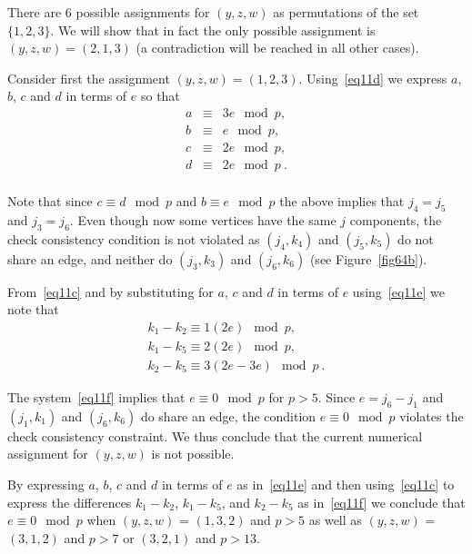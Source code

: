 There are 6 possible assignments for $(y,z,w)$ as permutations of
the set $\{1,2,3\}$. We will show that in fact the only possible
assignment is $(y,z,w)=(2,1,3)$ (a contradiction will be reached
in all other cases).

Consider first the assignment $(y,z,w)=(1,2,3)$.
Using~\eqref{eq11d} we express $a$, $b$, $c$ and $d$ in terms of
$e$ so that
\begin{equation}\label{eq11e}\begin{array}{cccc}
a &\equiv & 3e \mod p, \\
b &\equiv & e \mod p, \\
c &\equiv & 2e \mod p, \\
d &\equiv & 2e \mod p~. \\
\end{array}\end{equation}

Note that since $c \equiv d \mod p$ and  $b \equiv e \mod p$ the
above implies that $j_4=j_5$ and $j_3=j_6$. Even though now some
vertices have the same $j$ components, the check consistency
condition is not violated as $(j_4,k_4)$ and $(j_5,k_5)$ do not
share an edge, and neither do $(j_3,k_3)$ and $(j_6,k_6)$ (see
Figure~\ref{fig64b}).

From~\eqref{eq11c} and by substituting for $a$, $c$ and $d$ in
terms of $e$ using~\eqref{eq11e} we note that
\begin{equation}\label{eq11f}\begin{array}{cccc}
k_1-k_2 \equiv 1(2e) \mod p, \\
k_1-k_5 \equiv 2(2e) \mod p, \\
k_2-k_5 \equiv 3(2e-3e) \mod p~.
\end{array}\end{equation}

The system~\eqref{eq11f} implies that $e \equiv 0 \mod p$ for $p>5$.
Since $e=j_6-j_1$ and $(j_1,k_1)$ and $(j_6,k_6)$ do share an edge,
the condition $e \equiv 0 \mod p$ violates the check consistency
constraint. We thus conclude that the current numerical assignment
for $(y,z,w)$ is not possible.

By expressing $a$, $b$, $c$ and $d$ in terms of $e$ as
in~\eqref{eq11e} and then using~\eqref{eq11c} to express the
differences $k_1-k_2$, $k_1-k_5$, and $k_2-k_5$ as
in~\eqref{eq11f} we conclude that $e \equiv 0 \mod p$ when
$(y,z,w)$ = $(1,3,2)$ and $p>5$ as well as $(y,z,w)$ = $(3,1,2)$
and $p>7$ or $(3,2,1)$ and $p>13$.

